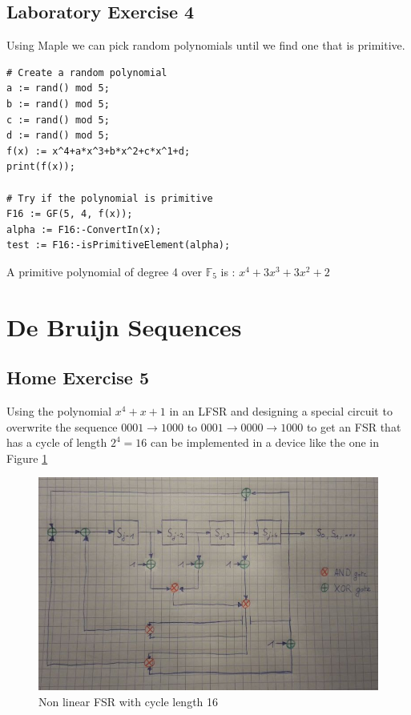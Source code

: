 \documentclass{article}
\begin{document}
\subsection{Laboratory Exercise 4}

Using Maple we can pick random polynomials until we find one that is primitive.
\begin{verbatim}
# Create a random polynomial
a := rand() mod 5;
b := rand() mod 5;
c := rand() mod 5;
d := rand() mod 5;
f(x) := x^4+a*x^3+b*x^2+c*x^1+d;
print(f(x));

# Try if the polynomial is primitive
F16 := GF(5, 4, f(x));
alpha := F16:-ConvertIn(x);	
test := F16:-isPrimitiveElement(alpha);
\end{verbatim}

A primitive polynomial of degree 4 over $\mathbb{F}_5$ is : $x^4+3x^3+3x^2+2$

\section{De Bruijn Sequences}

\subsection{Home Exercise 5}

Using the polynomial $x^4 + x + 1$ in an LFSR and designing a special circuit to overwrite the sequence $0001 \longrightarrow 1000$ to $0001 \longrightarrow 0000 \longrightarrow 1000$ to get an FSR that has a cycle of length $2^4=16$ can be implemented in a device like the one in Figure \ref{fig:NLFSR}

\begin{figure}[H]
    \centering
    \includegraphics[scale=0.5]{NonLinearFSR.jpg}
    \caption{Non linear FSR with cycle length 16}
    \label{fig:NLFSR}
\end{figure}
\end{document}
